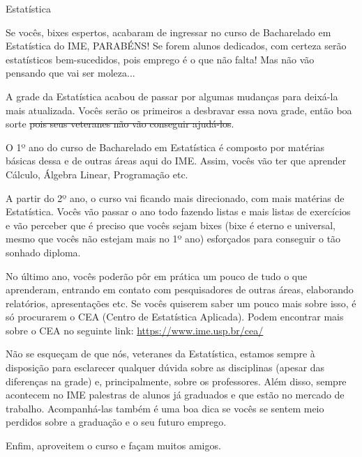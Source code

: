 \begin{subsecao}{Estatística}

Se vocês, bixes espertos, acabaram de ingressar no curso de Bacharelado em
Estatística do IME, PARABÉNS! Se forem alunos dedicados, com certeza serão
estatísticos bem-sucedidos, pois emprego é o que não falta! Mas não vão
pensando que vai ser moleza...

A grade da Estatística acabou de passar por algumas mudanças para deixá-la
mais atualizada. Vocês serão os primeiros a desbravar essa nova grade, então
boa sorte \sout{pois seus veteranes não vão conseguir ajudá-los}.

O 1º ano do curso de Bacharelado em Estatística é composto por matérias básicas
dessa e de outras áreas aqui do IME. Assim, vocês vão ter que aprender Cálculo,
Álgebra Linear, Programação etc.

A partir do 2º ano, o curso vai ficando mais direcionado, com mais matérias de
Estatística. Vocês vão passar o ano todo fazendo listas e mais listas de
exercícios e vão perceber que é preciso que vocês sejam bixes (bixe é eterno e
universal, mesmo que vocês não estejam mais no 1º ano) esforçados para conseguir o tão
sonhado diploma.

No último ano, vocês poderão pôr em prática um pouco de tudo o que
aprenderam, entrando em contato com pesquisadores de outras áreas, elaborando
relatórios, apresentações etc. Se vocês quiserem saber um pouco mais sobre
isso, é só procurarem o CEA (Centro de Estatística Aplicada). Podem encontrar
mais sobre o CEA no seguinte link: \url{https://www.ime.usp.br/cea/}

Não se esqueçam de que nós, veteranes da Estatística, estamos sempre à
disposição para esclarecer qualquer dúvida sobre as disciplinas (apesar %
das diferenças na grade) e, principalmente, sobre os professores. Além disso,
sempre acontecem no IME palestras de alunos já graduados e que estão no
mercado de trabalho. Acompanhá-las também é uma boa dica se vocês se sentem meio
perdidos sobre a graduação e o seu futuro emprego.

Enfim, aproveitem o curso e façam muitos amigos.

\end{subsecao}
